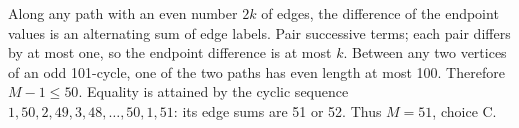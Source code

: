 Along any path with an even number $2k$ of edges, the difference of the endpoint values is an alternating sum of edge labels. Pair successive terms; each pair differs by at most one, so the endpoint difference is at most $k$. Between any two vertices of an odd 101-cycle, one of the two paths has even length at most 100. Therefore $M-1\le50$. Equality is attained by the cyclic sequence $1,50,2,49,3,48,\ldots,50,1,51$: its edge sums are 51 or 52. Thus $\boxed{M=51}$, choice C.
